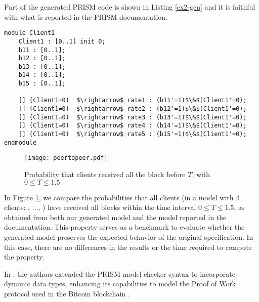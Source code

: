 Part of the generated PRISM code is shown in Listing \ref{ex2-gen} and it is faithful with what is reported in the PRISM documentation. 
\begin{lstlisting}[style=prism-color,caption={Generated PRISM program for the Peer-To-Peer Protocol},captionpos=b,label={ex2-gen}]
module Client1
	Client1 : [0..1] init 0;
	b11 : [0..1]; 
	b12 : [0..1]; 
	b13 : [0..1]; 
	b14 : [0..1]; 
	b15 : [0..1]; 

	[] (Client1=0)  $\rightarrow$ rate1 : (b11'=1)$\&$(Client1'=0); 
	[] (Client1=0)  $\rightarrow$ rate2 : (b12'=1)$\&$(Client1'=0); 
	[] (Client1=0)  $\rightarrow$ rate3 : (b13'=1)$\&$(Client1'=0); 
	[] (Client1=0)  $\rightarrow$ rate4 : (b14'=1)$\&$(Client1'=0); 
	[] (Client1=0)  $\rightarrow$ rate5 : (b15'=1)$\&$(Client1'=0); 
endmodule
\end{lstlisting}
\begin{figure}[h]
   \centering
   \texttt{[image: peertopeer.pdf]}	
   \caption{Probability that clients received all the block before $T$, with $0\leq T \leq 1.5$}
   \label{ex2-res}
   \end{figure}
   
   In Figure \ref{ex2-res}, we compare the probabilities that all clients (in a model with 4 
   clients: , $\ldots$, ) have received all blocks 
   within the time interval $0 \leq T \leq 1.5$, as obtained from both our generated model 
   and the model reported in the documentation. This property serves as a benchmark to 
   evaluate whether the generated model preserves the expected behavior of the original 
   specification. In this case, there are no differences in the results or the time required 
   to compute the property.

In \cite{DBLP:journals/concurrency/BistarelliNGLMV23}, the authors extended the PRISM model checker syntax to incorporate dynamic data types, enhancing its capabilities to model the Proof of Work protocol used in the Bitcoin blockchain \cite{bitcoin}. 

